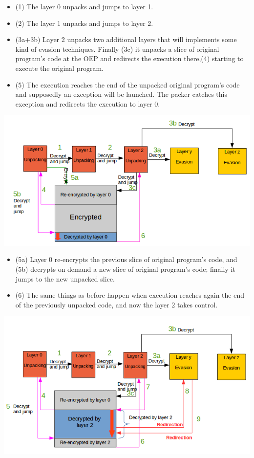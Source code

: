 \begin{itemize}
\item (1) The layer 0 unpacks and jumps to layer 1.
\item (2) The layer 1 unpacks and jumps to layer 2.
\item (3a+3b) Layer 2 unpacks two additional layers that will implements some kind of evasion techniques. Finally (3c) it unpacks a slice of original program's code at the \ac{OEP} and redirects the execution there,(4) starting to execute the original program.
\item (5) The execution reaches the end of the unpacked original program's code and supposedly an exception will be launched. The packer catches this exception and redirects the execution to layer 0.
\end{itemize}


\includegraphics[width=1.05\textwidth]{pictures/packer_type_6-1.png}

\begin{itemize}
\item (5a) Layer 0 re-encrypts the previous slice of original program's code, and (5b) decrypts on demand a new slice of original program's code; finally it jumps to the new unpacked slice.
\item (6) The same things as before happen when execution reaches again the end of the previously unpacked code, and now the layer 2 takes control.
\end{itemize}

\includegraphics[width=1.05\textwidth]{pictures/packer_type_6-2.png}


